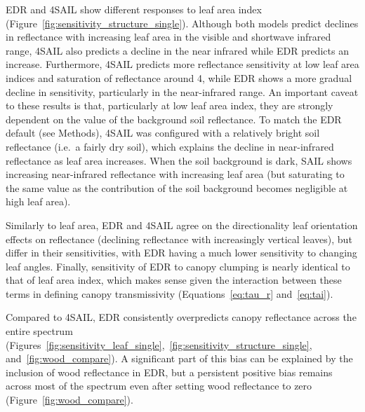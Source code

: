 EDR and 4SAIL show different responses to leaf area index (Figure~\ref{fig:sensitivity_structure_single}).
Although both models predict declines in reflectance with increasing leaf area in the visible and shortwave infrared range,
4SAIL also predicts a decline in the near infrared while EDR predicts an increase.
Furthermore, 4SAIL predicts more reflectance sensitivity at low leaf area indices and saturation of reflectance around 4, while EDR shows a more gradual decline in sensitivity, particularly in the near-infrared range. 
An important caveat to these results is that, particularly at low leaf area index, they are strongly dependent on the value of the background soil reflectance.
To match the EDR default (see Methods), 4SAIL was configured with a relatively bright soil reflectance (i.e.\ a fairly dry soil), which explains the decline in near-infrared reflectance as leaf area increases.
When the soil background is dark, SAIL shows increasing near-infrared reflectance with increasing leaf area (but saturating to the same value as the contribution of the soil background becomes negligible at high leaf area).

Similarly to leaf area, EDR and 4SAIL agree on the directionality leaf orientation effects on reflectance (declining reflectance with increasingly vertical leaves), but differ in their sensitivities, with EDR having a much lower sensitivity to changing leaf angles.
Finally, sensitivity of EDR to canopy clumping is nearly identical to that of leaf area index, which makes sense given the interaction between these terms in defining canopy transmissivity (Equations~\ref{eq:tau_r} and~\ref{eq:tai}).


Compared to 4SAIL, EDR consistently overpredicts canopy reflectance across the entire spectrum (Figures~\ref{fig:sensitivity_leaf_single},~\ref{fig:sensitivity_structure_single}, and~\ref{fig:wood_compare}).
A significant part of this bias can be explained by the inclusion of wood reflectance in EDR, but a persistent positive bias remains across most of the spectrum even after setting wood reflectance to zero (Figure~\ref{fig:wood_compare}).

